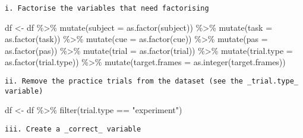 \documentclass[
]{article}
\newenvironment{Shaded}{\begin{snugshade}}{\end{snugshade}}
\newcommand{\AttributeTok}[1]{\textcolor[rgb]{0.77,0.63,0.00}{#1}}
\newcommand{\DecValTok}[1]{\textcolor[rgb]{0.00,0.00,0.81}{#1}}
\newcommand{\FunctionTok}[1]{\textcolor[rgb]{0.00,0.00,0.00}{#1}}
\newcommand{\NormalTok}[1]{#1}
\newcommand{\OtherTok}[1]{\textcolor[rgb]{0.56,0.35,0.01}{#1}}
\newcommand{\SpecialCharTok}[1]{\textcolor[rgb]{0.00,0.00,0.00}{#1}}
\newcommand{\StringTok}[1]{\textcolor[rgb]{0.31,0.60,0.02}{#1}}
\begin{document}
\begin{verbatim}
i. Factorise the variables that need factorising  
\end{verbatim}

\begin{Shaded}
\begin{Highlighting}[]
\NormalTok{df }\OtherTok{\textless{}{-}}\NormalTok{ df }\SpecialCharTok{\%\textgreater{}\%} 
  \FunctionTok{mutate}\NormalTok{(}\AttributeTok{subject =} \FunctionTok{as.factor}\NormalTok{(subject)) }\SpecialCharTok{\%\textgreater{}\%} 
  \FunctionTok{mutate}\NormalTok{(}\AttributeTok{task =} \FunctionTok{as.factor}\NormalTok{(task)) }\SpecialCharTok{\%\textgreater{}\%} 
  \FunctionTok{mutate}\NormalTok{(}\AttributeTok{cue =} \FunctionTok{as.factor}\NormalTok{(cue)) }\SpecialCharTok{\%\textgreater{}\%} 
  \FunctionTok{mutate}\NormalTok{(}\AttributeTok{pas =} \FunctionTok{as.factor}\NormalTok{(pas)) }\SpecialCharTok{\%\textgreater{}\%} 
  \FunctionTok{mutate}\NormalTok{(}\AttributeTok{trial =} \FunctionTok{as.factor}\NormalTok{(trial)) }\SpecialCharTok{\%\textgreater{}\%} 
  \FunctionTok{mutate}\NormalTok{(}\AttributeTok{trial.type =} \FunctionTok{as.factor}\NormalTok{(trial.type)) }\SpecialCharTok{\%\textgreater{}\%} 
  \FunctionTok{mutate}\NormalTok{(}\AttributeTok{target.frames =} \FunctionTok{as.integer}\NormalTok{(target.frames))}
\end{Highlighting}
\end{Shaded}

\begin{verbatim}
ii. Remove the practice trials from the dataset (see the _trial.type_ variable)
\end{verbatim}

\begin{Shaded}
\begin{Highlighting}[]
\NormalTok{df }\OtherTok{\textless{}{-}}\NormalTok{ df }\SpecialCharTok{\%\textgreater{}\%} 
  \FunctionTok{filter}\NormalTok{(trial.type }\SpecialCharTok{==} \StringTok{"experiment"}\NormalTok{)}
\end{Highlighting}
\end{Shaded}

\begin{verbatim}
iii. Create a _correct_ variable  
\end{verbatim}

\begin{Shaded}
\end{Shaded}
\end{document}
